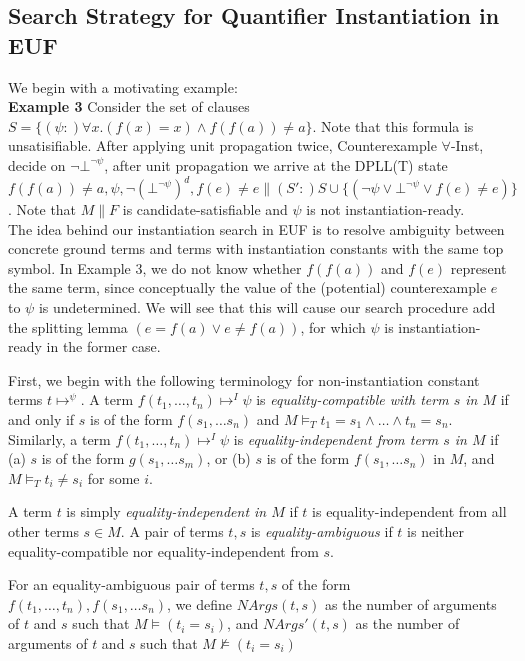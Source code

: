\documentclass{llncs}
\begin{document}
\subsection{Search Strategy for Quantifier Instantiation in EUF}

We begin with a motivating example: \\

{\bf Example 3}
Consider the set of clauses $S = \{ (\psi :)\forall x. (f( x ) = x) \wedge f( f( a ) ) \neq a \}$.  Note that this formula is unsatisifiable.
After applying unit propagation twice, Counterexample $\forall$-Inst, decide on $\neg \bot^{\neg \psi}$, after unit propagation we arrive at the DPLL(T) state $f( f( a ) ) \neq a, \psi, \neg (\bot^{\neg \psi})^d, f(e) \neq e \parallel (S':)S \cup \{ ( \neg \psi \vee \bot^{\neg \psi } \vee f( e ) \neq e ) \}$.
Note that $M \parallel F$ is candidate-satisfiable and $\psi$ is not instantiation-ready. \\

The idea behind our instantiation search in EUF is to resolve ambiguity between concrete ground terms and terms with instantiation constants with the same top symbol.
In Example 3, we do not know whether $f( f( a ) )$ and $f( e )$ represent the same term, since conceptually the value of the (potential) counterexample $e$ to $\psi$ is undetermined.
We will see that this will cause our search procedure add the splitting lemma $( e = f( a ) \vee e \neq f( a ) )$, for which $\psi$ is instantiation-ready in the former case.

First, we begin with the following terminology for non-instantiation constant terms $t \mapsto^ \psi$.
A term $f( t_1, \ldots, t_n ) \mapsto^I \psi$ is \emph{equality-compatible with term $s$ in $M$} if and only if $s$ is of the form $f( s_1, \ldots s_n )$ and $M \models_T t_1 = s_1 \wedge \ldots \wedge t_n = s_n$.
Similarly, a term $f( t_1, \ldots, t_n ) \mapsto^I \psi$ is \emph{equality-independent from term $s$ in $M$} if (a) $s$ is of the form $g( s_1, \ldots s_m )$, or (b) $s$ is of the form $f( s_1, \ldots s_n )$ in $M$, and $M \models_T t_i \neq s_i$ for some $i$. 

A term $t$ is simply \emph{equality-independent in $M$} if $t$ is equality-independent from all other terms $s \in M$.  
A pair of terms $t, s$ is \emph{equality-ambiguous} if $t$ is neither equality-compatible nor equality-independent from $s$.

For an equality-ambiguous pair of terms $t, s$ of the form $f( t_1, \ldots, t_n ), f( s_1, \ldots s_n )$, we define $NArgs( t, s )$ as the number of arguments of $t$ and $s$ such that $M \models (t_i = s_i)$, and $NArgs'( t, s )$ as the number of arguments of $t$ and $s$ such that $M \not\models (t_i = s_i)$
\end{document}
